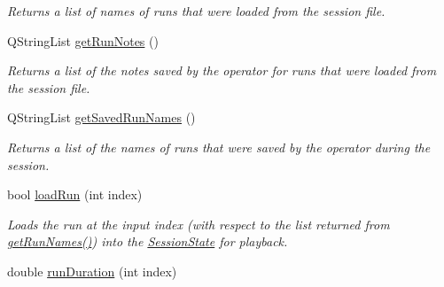 \begin{DoxyCompactItemize}
\begin{DoxyCompactList}\small\item\em Returns a list of names of runs that were loaded from the session file. \end{DoxyCompactList}\item 
Q\-String\-List \hyperlink{class_picto_1_1_file_session_loader_a52ffa900efd0cece36ec15bf6e77840c}{get\-Run\-Notes} ()
\begin{DoxyCompactList}\small\item\em Returns a list of the notes saved by the operator for runs that were loaded from the session file. \end{DoxyCompactList}\item 
\hypertarget{class_picto_1_1_file_session_loader_acf54d9159b81f9e9383a020b0eba2fb2}{Q\-String\-List \hyperlink{class_picto_1_1_file_session_loader_acf54d9159b81f9e9383a020b0eba2fb2}{get\-Saved\-Run\-Names} ()}\label{class_picto_1_1_file_session_loader_acf54d9159b81f9e9383a020b0eba2fb2}

\begin{DoxyCompactList}\small\item\em Returns a list of the names of runs that were saved by the operator during the session. \end{DoxyCompactList}\item 
bool \hyperlink{class_picto_1_1_file_session_loader_a303ad7f65d6cced38432128826fedd0c}{load\-Run} (int index)
\begin{DoxyCompactList}\small\item\em Loads the run at the input index (with respect to the list returned from \hyperlink{class_picto_1_1_file_session_loader_a594062ade9010399ea05e273387ef9d9}{get\-Run\-Names()}) into the \hyperlink{class_picto_1_1_session_state}{Session\-State} for playback. \end{DoxyCompactList}\item 
\hypertarget{class_picto_1_1_file_session_loader_a4dbbd4950265373486648c21b0d12d0b}{double \hyperlink{class_picto_1_1_file_session_loader_a4dbbd4950265373486648c21b0d12d0b}{run\-Duration} (int index)}\label{class_picto_1_1_file_session_loader_a4dbbd4950265373486648c21b0d12d0b}


\end{DoxyCompactItemize}
